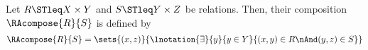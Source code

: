\begin{definition}
\label{def:composition}
	Let $R \STleq X \times Y$ and $S \STleq Y \times Z$ be relations. Then, their composition $\RAcompose{R}{S}$ is defined by
	\begin{equation*}
		\RAcompose{R}{S} = \sets{(x,z)}{\lnotation{\exists}{y}{y \in Y}{(x,y) \in R \nAnd (y,z) \in S}}
	\end{equation*}
\end{definition}